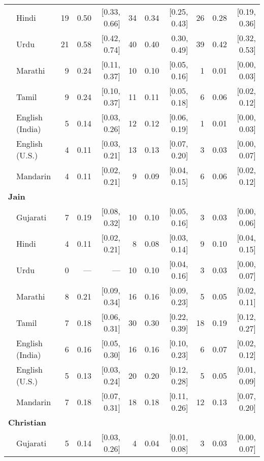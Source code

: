 \begin{table}[H]
\begin{footnotesize}
\begin{tabular}{p{.1in}lrrrrrrrrr}
 & Hindi & 19 & 0.50 & [0.33, 0.66] & 34 & 0.34 & [0.25, 0.43] & 26 & 0.28 & [0.19, 0.36]\\

 & Urdu & 21 & 0.58 & [0.42, 0.74] & 40 & 0.40 & 0.30, 0.49] & 39 & 0.42 & [0.32, 0.53]\\

 & Marathi & 9 & 0.24 & [0.11, 0.37] & 10 & 0.10 & [0.05, 0.16] & 1 & 0.01 & [0.00, 0.03]\\

 & Tamil & 9 & 0.24 & [0.10, 0.37] & 11 & 0.11 & [0.05, 0.18] & 6 & 0.06 & [0.02, 0.12]\\

 & English (India) & 5 & 0.14 & [0.03, 0.26] & 12 & 0.12 & [0.06, 0.19] & 1 & 0.01 & [0.00, 0.03]\\

 & English (U.S.) & 4 & 0.11 & [0.03, 0.21] & 13 & 0.13 & [0.07, 0.20] & 3 & 0.03 & [0.00, 0.07]\\
 & Mandarin & 4 & 0.11 & [0.02, 0.21] & 9 & 0.09 & [0.04, 0.15] & 6 & 0.06 & [0.02, 0.12]\\
 \midrule
\multicolumn{11}{l}{\textbf{Jain}}\\
  & Gujarati & 7 & 0.19 & [0.08, 0.32] & 10 & 0.10 & [0.05, 0.16] & 3 & 0.03 & [0.00, 0.06]\\

 & Hindi & 4 & 0.11 & [0.02, 0.21] & 8 & 0.08 & [0.03, 0.14] & 9 & 0.10 & [0.04, 0.15]\\

 & Urdu & 0 & --- & --- & 10 & 0.10 & [0.04, 0.16] & 3 & 0.03 & [0.00, 0.07]\\

 & Marathi & 8 & 0.21 & [0.09, 0.34] & 16 & 0.16 & [0.09, 0.23] & 5 & 0.05 & [0.02, 0.11]\\

 & Tamil & 7 & 0.18 & [0.06, 0.31] & 30 & 0.30 & [0.22, 0.39] & 18 & 0.19 & [0.12, 0.27]\\

 & English (India) & 6 & 0.16 & [0.05, 0.30] & 16 & 0.16 & [0.10, 0.23] & 6 & 0.07 & [0.02, 0.12]\\

 & English (U.S.) & 5 & 0.13 & [0.03, 0.24] & 20 & 0.20 & [0.12, 0.28] & 5 & 0.05 & [0.01, 0.09]\\

& Mandarin & 7 & 0.18 & [0.07, 0.31] & 18 & 0.18 & [0.11, 0.26] & 12 & 0.13 & [0.07, 0.20]\\
 \midrule
\multicolumn{11}{l}{\textbf{Christian}}\\
 & Gujarati & 5 & 0.14 & [0.03, 0.26] & 4 & 0.04 & [0.01, 0.08] & 3 & 0.03 & [0.00, 0.07]\\


\end{tabular}
\end{footnotesize}
\end{table}
